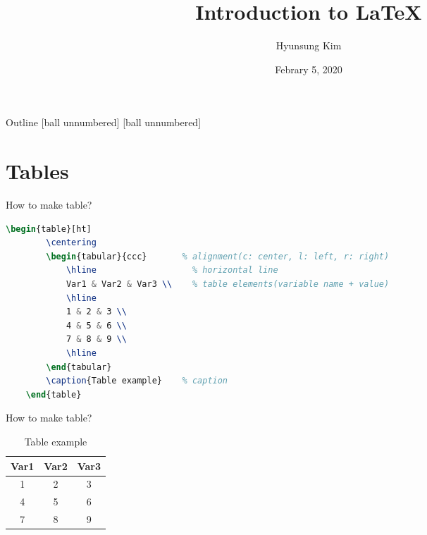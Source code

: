 \documentclass{beamer}
\title{Introduction to \LaTeX}
\date[Short Occasion]{Febrary 5, 2020}
\author{Hyunsung Kim}
\institute[Deptartment of Statistics]
	{Department of Statistics\\
	Chung-Ang University}
\begin{document}
\begin{frame}
  \titlepage
\end{frame}

\begin{frame}{Outline}
	[ball unnumbered]
	[ball unnumbered]
	\tableofcontents
\end{frame}


\section{Tables}

\begin{frame}[containsverbatim]{How to make table?}
	\begin{lstlisting}[language=TeX, basicstyle=\tiny, caption=Table example code]
	\begin{table}[ht]
		\centering
		\begin{tabular}{ccc}       % alignment(c: center, l: left, r: right)
			\hline                   % horizontal line
			Var1 & Var2 & Var3 \\    % table elements(variable name + value)
			\hline
			1 & 2 & 3 \\
			4 & 5 & 6 \\
			7 & 8 & 9 \\
			\hline
		\end{tabular}
		\caption{Table example}    % caption
	\end{table}   \end{lstlisting}
\end{frame}

\begin{frame}{How to make table?}
	\begin{table}[ht]
		\centering
		\begin{tabular}{ccc}
			\hline
			Var1 & Var2 & Var3 \\ 
			\hline
			1 & 2 & 3 \\ 
			4 & 5 & 6 \\
			7 & 8 & 9 \\
			\hline
		\end{tabular}
		\caption{Table example}
	\end{table}
\end{frame}
\end{document}
